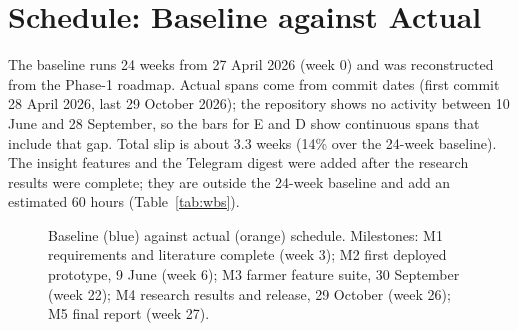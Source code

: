 \section{Schedule: Baseline against Actual}
\label{sec:gantt}

The baseline runs 24 weeks from 27 April 2026 (week 0) and was reconstructed from the Phase-1 roadmap. Actual spans come from commit dates (first commit 28 April 2026, last 29 October 2026); the repository shows no activity between 10 June and 28 September, so the bars for E and D show continuous spans that include that gap. Total slip is about 3.3 weeks (14\% over the 24-week baseline). The insight features and the Telegram digest were added after the research results were complete; they are outside the 24-week baseline and add an estimated 60 hours (Table~\ref{tab:wbs}).

\begin{figure}[!t]
\centering
{}
\caption{Baseline (blue) against actual (orange) schedule. Milestones: M1 requirements and literature complete (week 3); M2 first deployed prototype, 9 June (week 6); M3 farmer feature suite, 30 September (week 22); M4 research results and release, 29 October (week 26); M5 final report (week 27).}
\label{fig:gantt}
\end{figure}

